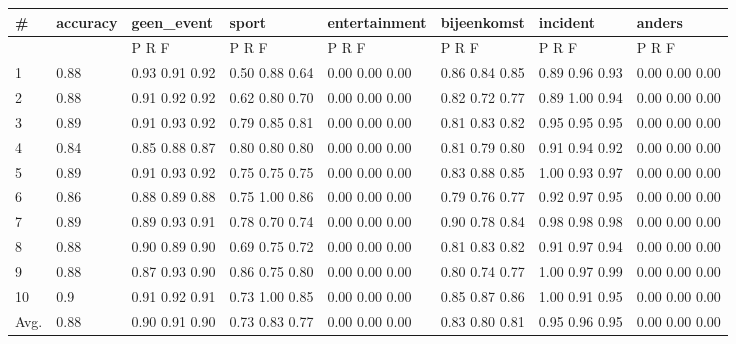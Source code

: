 \documentclass[
10pt, %
a4paper, %
oneside, %
headinclude,footinclude, %
BCOR5mm, %
]{scrartcl}
\begin{document}
\newpage
\begin{landscape}
\begin{tabular}{llllllll}
\hline
 \#    & accuracy   & geen\_event     & sport          & entertainment   & bijeenkomst    & incident       & anders         \\
\hline
      &            & P    R    F    & P    R    F    & P    R    F     & P    R    F    & P    R    F    & P    R    F    \\
 1    & 0.88       & 0.93 0.91 0.92 & 0.50 0.88 0.64 & 0.00 0.00 0.00  & 0.86 0.84 0.85 & 0.89 0.96 0.93 & 0.00 0.00 0.00 \\
 2    & 0.88       & 0.91 0.92 0.92 & 0.62 0.80 0.70 & 0.00 0.00 0.00  & 0.82 0.72 0.77 & 0.89 1.00 0.94 & 0.00 0.00 0.00 \\
 3    & 0.89       & 0.91 0.93 0.92 & 0.79 0.85 0.81 & 0.00 0.00 0.00  & 0.81 0.83 0.82 & 0.95 0.95 0.95 & 0.00 0.00 0.00 \\
 4    & 0.84       & 0.85 0.88 0.87 & 0.80 0.80 0.80 & 0.00 0.00 0.00  & 0.81 0.79 0.80 & 0.91 0.94 0.92 & 0.00 0.00 0.00 \\
 5    & 0.89       & 0.91 0.93 0.92 & 0.75 0.75 0.75 & 0.00 0.00 0.00  & 0.83 0.88 0.85 & 1.00 0.93 0.97 & 0.00 0.00 0.00 \\
 6    & 0.86       & 0.88 0.89 0.88 & 0.75 1.00 0.86 & 0.00 0.00 0.00  & 0.79 0.76 0.77 & 0.92 0.97 0.95 & 0.00 0.00 0.00 \\
 7    & 0.89       & 0.89 0.93 0.91 & 0.78 0.70 0.74 & 0.00 0.00 0.00  & 0.90 0.78 0.84 & 0.98 0.98 0.98 & 0.00 0.00 0.00 \\
 8    & 0.88       & 0.90 0.89 0.90 & 0.69 0.75 0.72 & 0.00 0.00 0.00  & 0.81 0.83 0.82 & 0.91 0.97 0.94 & 0.00 0.00 0.00 \\
 9    & 0.88       & 0.87 0.93 0.90 & 0.86 0.75 0.80 & 0.00 0.00 0.00  & 0.80 0.74 0.77 & 1.00 0.97 0.99 & 0.00 0.00 0.00 \\
 10   & 0.9        & 0.91 0.92 0.91 & 0.73 1.00 0.85 & 0.00 0.00 0.00  & 0.85 0.87 0.86 & 1.00 0.91 0.95 & 0.00 0.00 0.00 \\
 Avg. & 0.88       & 0.90 0.91 0.90 & 0.73 0.83 0.77 & 0.00 0.00 0.00  & 0.83 0.80 0.81 & 0.95 0.96 0.95 & 0.00 0.00 0.00 \\
\hline
\end{tabular}\end{landscape}


\end{document}
